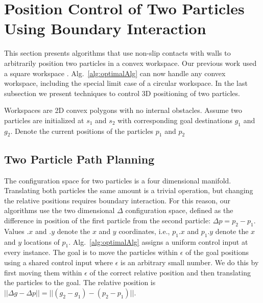 

\section{Position Control of Two Particles Using Boundary Interaction}\label{sec:PostionControl2Robots}

This section presents algorithms that use non-slip contacts with walls to arbitrarily position two particles in a convex workspace. Our previous work used a square workspace \cite{shahrokhi2017algorithms}. Alg.~\ref{alg:optimalAlg} can now handle any convex workspace, including the special limit case of a circular workspace. In the last subsection we present techniques to control 3D positioning of two particles.

Workspaces are 2D convex polygons with no internal obstacles. 
 Assume two particles are initialized at $s_1$ and $s_2$ with corresponding goal destinations $g_1$ and $g_2$. 
Denote the current positions of the particles  $p_1$ and $p_2$ 



\subsection{Two Particle Path Planning}


The configuration space for two particles is a four dimensional manifold. Translating both particles the same amount is a trivial operation, but changing the relative positions requires boundary interaction. For this reason, our algorithms use the two dimensional $\Delta$ configuration space, defined as the difference in position of the first particle from the second particle: $\Delta p = p_2 - p_1$.
 Values $.x$ and $.y$ denote the $x$ and $y$ coordinates, i.e., $p_1.x$ and $p_1.y$ denote the $x$ and $y$ locations of $p_1$. 
Alg.~\ref{alg:optimalAlg} assigns a uniform control input at every instance.
The goal is to move the particles within $\epsilon$ of the goal positions using a shared control input where $\epsilon$ is an arbitrary small number. We do this by first moving them within $\epsilon$ of the correct relative position and then translating the particles to the goal. The relative position is $||\Delta g - \Delta p || = ||(g_2-g_1)- (p_2-p_1)||$.  
 
